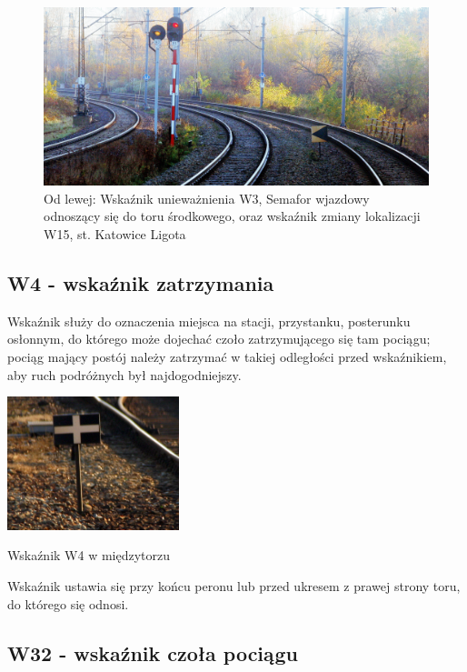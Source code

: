 	\begin{figure}
		\includegraphics[width=14cm]{skryptkierownik-img/skryptkierownik-img005.jpg}
		\caption{Od lewej: Wskaźnik unieważnienia W3, Semafor wjazdowy odnoszący się do toru środkowego, oraz wskaźnik zmiany lokalizacji W15, st. Katowice Ligota}
	\end{figure}

\subsection{W4 - wskaźnik zatrzymania}

Wskaźnik służy do oznaczenia miejsca na stacji, przystanku, posterunku osłonnym, do którego może dojechać czoło zatrzymującego się tam pociągu; pociąg mający postój należy zatrzymać w takiej odległości przed wskaźnikiem, aby ruch podróżnych był najdogodniejszy.	
\begin{marginfigure}
	\includegraphics[width=5cm]{skryptkierownik-img/skryptkierownik-img006.jpg}
	\caption{Wskaźnik W4 w międzytorzu}
\end{marginfigure} 
Wskaźnik ustawia się przy końcu peronu lub przed ukresem z prawej strony toru, do którego się odnosi.

\subsection{W32 - wskaźnik czoła pociągu}


